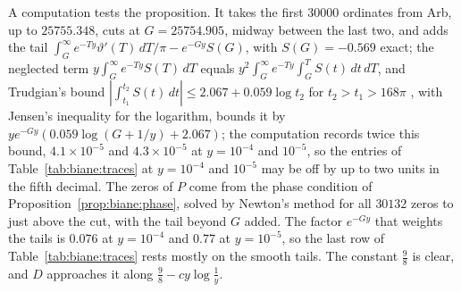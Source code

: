 A computation tests the proposition. It takes the first $30000$ ordinates from Arb, up to $25755.348$, cuts at $G=25754.905$, midway between the last two, and adds the tail $\int_G^\infty e^{-Ty}\vartheta'(T)\,dT/\pi-e^{-Gy}S(G)$, with $S(G)=-0.569$ exact; the neglected term $y\int_G^\infty e^{-Ty}S(T)\,dT$ equals $y^2\int_G^\infty e^{-Ty}\int_G^TS(t)\,dt\,dT$, and Trudgian's bound $|\int_{t_1}^{t_2}S(t)\,dt|\le2.067+0.059\log t_2$ for $t_2>t_1>168\pi$ \cite{Trudgian11}, with Jensen's inequality for the logarithm, bounds it by $ye^{-Gy}(0.059\log(G+1/y)+2.067)$; the computation records twice this bound, $4.1\times10^{-5}$ and $4.3\times10^{-5}$ at $y=10^{-4}$ and $10^{-5}$, so the entries of Table~\ref{tab:biane:traces} at $y=10^{-4}$ and $10^{-5}$ may be off by up to two units in the fifth decimal. The zeros of $P$ come from the phase condition of Proposition~\ref{prop:biane:phase}, solved by Newton's method for all $30132$ zeros to just above the cut, with the tail beyond $G$ added. The factor $e^{-Gy}$ that weights the tails is $0.076$ at $y=10^{-4}$ and $0.77$ at $y=10^{-5}$, so the last row of Table~\ref{tab:biane:traces} rests mostly on the smooth tails. The constant $\frac98$ is clear, and $D$ approaches it along $\frac98-cy\log\frac1y$.

\begin{table}[htbp]
\centering\small
{}
\caption{The Poisson trace $K_{1/2}$ of the zeros of $\zeta$, P\'olya's trace $K^P$, their distances from the common main term $M$, which tend to $\frac78$ and $-\frac14$, and their difference $D$, which tends to $\frac98$, against the prediction of Proposition~\ref{prop:biane:traces} under RH. Computed.}
\label{tab:biane:traces}
\end{table}

